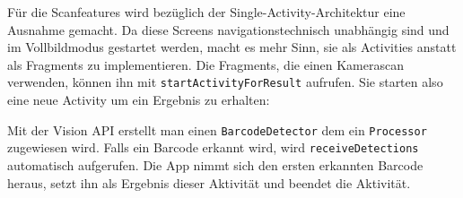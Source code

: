 Für die Scanfeatures wird bezüglich der Single-Activity-Architektur eine
Ausnahme gemacht. Da diese Screens navigationstechnisch unabhängig sind
und im Vollbildmodus gestartet werden, macht es mehr Sinn, sie als
Activities anstatt als Fragments zu implementieren. Die Fragments, die
einen Kamerascan verwenden, können ihn mit
\texttt{startActivityForResult} aufrufen. Sie starten also eine neue
Activity um ein Ergebnis zu erhalten:

\begin{Shaded}
\begin{Highlighting}[]
 \NormalTok{(}\NormalTok{);}
\NormalTok{);}
\end{Highlighting}
\end{Shaded}

Mit der Vision API erstellt man einen \texttt{BarcodeDetector} dem ein
\texttt{Processor} zugewiesen wird. Falls ein Barcode erkannt wird, wird
\texttt{receiveDetections} automatisch aufgerufen. Die App nimmt sich
den ersten erkannten Barcode heraus, setzt ihn als Ergebnis dieser
Aktivität und beendet die Aktivität.

\begin{Shaded}
\begin{Highlighting}[]
\NormalTok{(}

      
           \NormalTok{(}\NormalTok{;}

 \NormalTok{();}
\NormalTok{(}
           \NormalTok{();}
\NormalTok{    \}}
\NormalTok{\}}
\end{Highlighting}
\end{Shaded}

